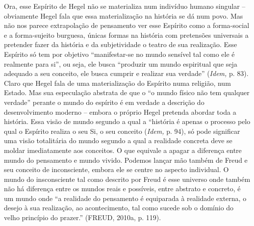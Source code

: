 Ora, esse Espírito de Hegel não se materializa num indivíduo humano
singular -- obviamente Hegel fala que essa materialização na história se
dá num povo. Mas não nos parece extrapolação de pensamento ver esse
Espírito como a forma-social e a forma-sujeito burguesa, únicas formas
na história com pretensões universais a pretender fazer da história e da
subjetividade o teatro de sua realização. Esse Espírito só tem por
objetivo ``manifestar-se no mundo sensível tal como ele é realmente para
si'', ou seja, ele busca ``produzir um mundo espiritual que seja
adequado a seu conceito, ele busca cumprir e realizar sua verdade''
(\emph{Idem,} p. 83). Claro que Hegel fala de uma materialização do
Espírito numa religião, num Estado. Mas sua especulação abstrata de que
o ``o mundo físico não tem qualquer verdade'' perante o mundo do
espírito é em verdade a descrição do desenvolvimento moderno -- embora o
próprio Hegel pretenda abordar toda a história. Essa visão de mundo
segundo a qual a ``história é apenas o processo pelo qual o Espírito
realiza o seu Si, o seu conceito (\emph{Idem,} p. 94), só pode
significar uma visão totalitária do mundo segundo a qual a realidade
concreta deve se moldar imediatamente aos conceitos. O que equivale a
apagar a diferença entre mundo do pensamento e mundo vivido. Podemos
lançar mão também de Freud e seu conceito de inconsciente, embora ele se
centre no aspecto individual. O mundo do insconsciente tal como descrito
por Freud é esse universo onde também não há diferença entre os mundos
reais e possíveis, entre abstrato e concreto, é um mundo onde ``a
realidade do pensamento é equiparada à realidade externa, o desejo à sua
realização, ao acontecimento, tal como sucede sob o domínio do velho
princípio do prazer.'' (FREUD, 2010a, p. 119).

